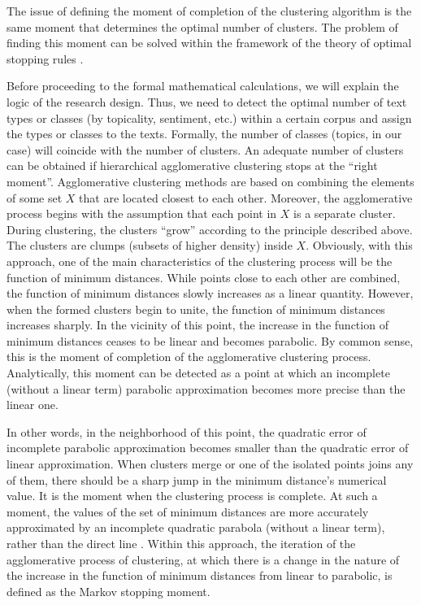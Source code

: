 The issue of defining the moment of completion of the clustering algorithm is the same moment that determines the optimal number of clusters. The problem of finding this moment can be solved within the framework of the theory of optimal stopping rules \cite{Wald,Sirjaev}.

Before proceeding to the formal mathematical calculations, we will explain the logic of the research design. Thus, we need to detect the optimal number of text types or classes (by topicality, sentiment, etc.) within a certain corpus and assign the types or classes to the texts. Formally, the number of classes (topics, in our case) will coincide with the number of clusters. An adequate number of clusters can be obtained if hierarchical agglomerative clustering stops at the “right moment”. Agglomerative clustering methods are based on combining the elements of some set \(X\) that are located closest to each other. Moreover, the agglomerative process begins with the assumption that each point in \(X\) is a separate cluster. During clustering, the clusters “grow” according to the principle described above. The clusters are clumps (subsets of higher density) inside \(X\). Obviously, with this approach, one of the main characteristics of the clustering process will be the function of minimum distances. While points close to each other are combined, the function of minimum distances slowly increases as a linear quantity. However, when the formed clusters begin to unite, the function of minimum distances increases sharply. In the vicinity of this point, the increase in the function of minimum distances ceases to be linear and becomes parabolic. By common sense, this is the moment of completion of the agglomerative clustering process. Analytically, this moment can be detected as a point at which an incomplete (without a linear term) parabolic approximation becomes more precise than the linear one.

In other words, in the neighborhood of this point, the quadratic error of incomplete parabolic approximation becomes smaller than the quadratic error of linear approximation. When clusters merge or one of the isolated points joins any of them, there should be a sharp jump in the minimum distance’s numerical value. It is the moment when the clustering process is complete. At such a moment, the values of the set of minimum distances are more accurately approximated by an incomplete quadratic parabola (without a linear term), rather than the direct line \cite{Orekhov,Orekhov201811}. Within this approach, the iteration of the agglomerative process of clustering, at which there is a change in the nature of the increase in the function of minimum distances from linear to parabolic, is defined as the Markov stopping moment.

